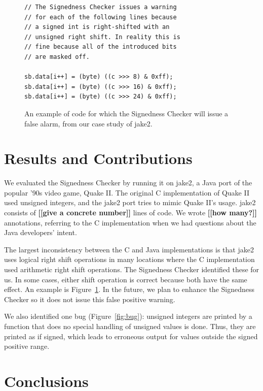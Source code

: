 \documentclass{sig-alternate-05-2015}
\newcommand{\todo}[1]{{\color{red}\bfseries [[#1]]}}
\def\<#1>{\codeid{#1}}
\begin{document}
\begin{figure}
\begin{lstlisting}
// The Signedness Checker issues a warning
// for each of the following lines because
// a signed int is right-shifted with an
// unsigned right shift. In reality this is
// fine because all of the introduced bits
// are masked off.

sb.data[i++] = (byte) ((c >>> 8) & 0xff);
sb.data[i++] = (byte) ((c >>> 16) & 0xff);
sb.data[i++] = (byte) ((c >>> 24) & 0xff);

\end{lstlisting}
\vspace{-10pt}
\caption{An example of code for which the Signedness Checker will issue a false
alarm, from our case study of jake2.}
\label{fig:false-alarm}
\end{figure}

\section{Results and Contributions}

We evaluated the Signedness Checker by running it on jake2, a Java
port of the popular '90s video game, Quake II\@.  The original C
implementation of Quake II used unsigned integers, and the jake2 port
tries to mimic Quake II's usage.
jake2 consists of \todo{give a concrete number} lines of code.
We wrote \todo{how many?} \<@Unsigned> annotations, referring to the
C implementation when we had questions about the Java developers' intent.

The largest inconsistency between the C and Java implementations is that
jake2 uses logical right shift operations 
in many locations where the C implementation used arithmetic right shift
operations.  The Signedness Checker identified these for us.
In some cases, either shift operation is correct because both have the same
effect.  An example is Figure~\ref{fig:false-alarm}.  In the future, we
plan to enhance the Signedness Checker so it does not issue this false
positive warning.

We also identified one bug (Figure~\ref{fig:bug}):
unsigned integers are printed by a function that does no special handling
of unsigned values is done.  Thus, they are printed as
if signed, which leads to erroneous output for values outside the signed
positive range.


\section{Conclusions}
\end{document}
